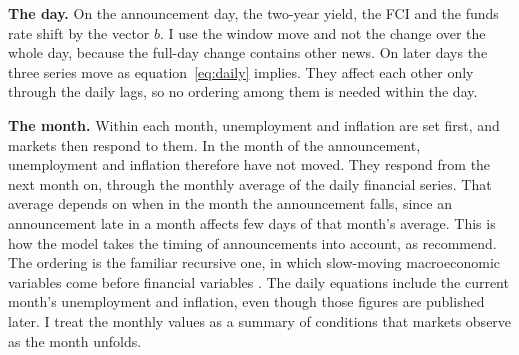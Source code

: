 \documentclass[11pt]{article}
\begin{document}
\textbf{The day.} On the announcement day, the two-year yield, the FCI and the funds rate shift by the vector $b$. I use the window move and not the change over the whole day, because the full-day change contains other news. On later days the three series move as equation~\eqref{eq:daily} implies. They affect each other only through the daily lags, so no ordering among them is needed within the day.

\textbf{The month.} Within each month, unemployment and inflation are set first, and markets then respond to them. In the month of the announcement, unemployment and inflation therefore have not moved. They respond from the next month on, through the monthly average of the daily financial series. That average depends on when in the month the announcement falls, since an announcement late in a month affects few days of that month's average. This is how the model takes the timing of announcements into account, as \citet{jacobson2026} recommend. The ordering is the familiar recursive one, in which slow-moving macroeconomic variables come before financial variables \citep{bernanke1992,christiano1999}. The daily equations include the current month's unemployment and inflation, even though those figures are published later. I treat the monthly values as a summary of conditions that markets observe as the month unfolds.
\end{document}
